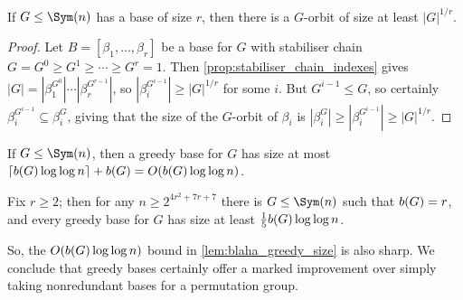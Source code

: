 \begin{lemma}\label{lem:blaha_greedy_orbit}
    If $G \leq \Sym(n)$ has a base of size $r$, then there is a $G$-orbit of size at least $|G|^{1/r}$.
\end{lemma}

\begin{proof}
    Let $B = [\beta_1,\dotsc,\beta_r]$ be a base for $G$ with stabiliser chain $G = G^0 \geq G^1 \geq \dotsb \geq G^r = 1$. Then \autoref{prop:stabiliser_chain_indexes} gives $|G| = |\beta_1^{G^0}| \dotsb |\beta_r^{G^{r-1}}|$, so $|\beta_i^{G^{i-1}}| \geq |G|^{1/r}$ for some $i$. But $G^{i-1} \leq G$, so certainly $\beta_i^{G^{i-1}} \subseteq \beta_i^G$, giving that the size of the $G$-orbit of $\beta_i$ is $|\beta_i^G| \geq |\beta_i^{G^{i-1}}| \geq |G|^{1/r}$.
\end{proof}


\begin{theorem}[Blaha, 1992]\label{lem:blaha_greedy_size}
    If $G \leq \Sym(n)$, then a greedy base for $G$ has size at most $\lceil \added{2}{b(G)}\log\log n \rceil + \added{2}{b(G)} = O(\added{2}{b(G)}\log\log n)$.
\end{theorem}




\begin{theorem}[Blaha, 1992]\label{thm:blaha_greedy_sharp}
    Fix $r \geq 2$; then for any $n \geq 2^{4r^2 + 7r + 7}$ there is $G \leq \Sym(n)$ such that $\added{2}{b(G)} = r$, and every greedy base for $G$ has size at least $\frac{1}{5}\added{2}{b(G)}\log\log n$.
\end{theorem}


So, the $O(\added{2}{b(G)}\log\log n)$ bound in \autoref{lem:blaha_greedy_size} is also sharp. We conclude that greedy bases certainly offer a marked improvement over simply taking nonredundant bases for a permutation group.